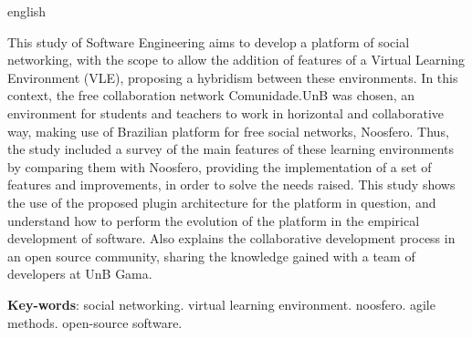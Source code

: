 \begin{resumo}[Abstract]
  \begin{otherlanguage*}{english}  

This study of Software Engineering aims to develop a platform of social
networking, with the scope to allow the addition of features of a Virtual
Learning Environment (VLE), proposing a hybridism between these environments.
In this context,  the free collaboration network Comunidade.UnB was chosen, an
environment for students and teachers to work in horizontal and collaborative
way, making use of Brazilian platform for free social networks, Noosfero. Thus,
the study included a survey of the main features of these learning environments
by comparing them with Noosfero, providing the implementation of a set of
features and improvements, in order to solve the needs raised. This study shows
the use of the proposed plugin architecture for the platform in question, and
understand how to perform the evolution of the platform in the empirical
development of software. Also explains the collaborative development process
in an open source community, sharing the knowledge gained with a team of
developers at UnB Gama.

  \vspace{\onelineskip}
 
  \noindent 
  \textbf{Key-words}: social networking. virtual learning environment. noosfero. agile methods. open-source software.
  \end{otherlanguage*}
\end{resumo}

